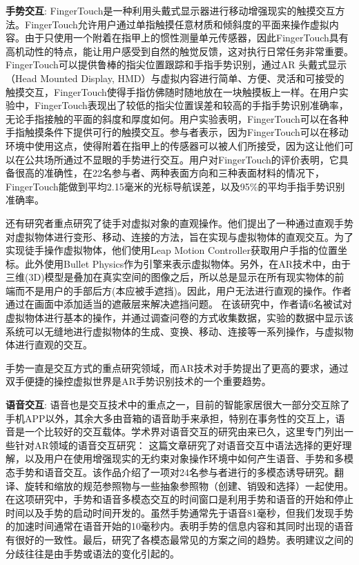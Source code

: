 \textbf{手势交互}: 
FingerTouch\cite{OhParPar20}是一种利用头戴式显示器进行移动增强现实的触摸交互方法。FingerTouch允许用户通过单指触摸任意材质和倾斜度的平面来操作虚拟内容。由于只使用一个附着在指甲上的惯性测量单元传感器，因此FingerTouch具有高机动性的特点，能让用户感受到自然的触觉反馈，这对执行日常任务非常重要。
FingerTouch可以提供鲁棒的指尖位置跟踪和手指手势识别，通过AR 头戴式显示（Head Mounted Display, HMD）与虚拟内容进行简单、方便、灵活和可接受的触摸交互，FingerTouch使得手指仿佛随时随地放在一块触摸板上一样。在用户实验中，FingerTouch表现出了较低的指尖位置误差和较高的手指手势识别准确率，无论手指接触的平面的斜度和厚度如何。用户实验表明，FingerTouch可以在各种手指触摸条件下提供可行的触摸交互。参与者表示，因为FingerTouch可以在移动环境中使用这点，使得附着在指甲上的传感器可以被人们所接受，因为这让他们可以在公共场所通过不显眼的手势进行交互。用户对FingerTouch的评价表明，它具备很高的准确性，在22名参与者、两种表面方向和三种表面材料的情况下，FingerTouch能做到平均2.15毫米的光标导航误差，以及95\%的平均手指手势识别准确率。

还有研究者\cite{SakIshHor20}重点研究了徒手对虚拟对象的直观操作。他们提出了一种通过直观手势对虚拟物体进行变形、移动、连接的方法，旨在实现与虚拟物体的直观交互。为了实现徒手操作虚拟物体，他们使用Leap Motion Controller\cite{ultraleap}获取用户手指的位置坐标。此外使用Bullet Physics\cite{BulletPhysics}作为引擎来表示虚拟物体。另外，在AR技术中，由于三维(3D)模型是叠加在真实空间的图像之后，所以总是显示在所有现实物体的前端而不是用户的手部后方(本应被手遮挡)。因此，用户无法进行直观的操作。作者通过在画面中添加适当的遮蔽层来解决遮挡问题。
在该研究中，作者请6名被试对虚拟物体进行基本的操作，并通过调查问卷的方式收集数据，实验的数据中显示该系统可以无缝地进行虚拟物体的生成、变换、移动、连接等一系列操作，与虚拟物体进行直观的交互。

手势一直是交互方式的重点研究领域，而AR技术对手势提出了更高的要求，通过双手便捷的操控虚拟世界是AR手势识别技术的一个重要趋势。

\textbf{语音交互}: 
语音也是交互技术中的重点之一，目前的智能家居很大一部分交互除了手机APP以外，其余大多由音箱的语音助手来承担，特别在事务性的交互上，语音是一个比较好的交互载体。学术界对语音交互的研究由来已久，这里专门列出一些针对AR领域的语音交互研究：
这篇文章\cite{WilOrt20}研究了对语音交互中语法选择的更好理解，以及用户在使用增强现实的无约束对象操作环境中如何产生语音、手势和多模态手势和语音交互。该作品介绍了一项对24名参与者进行的多模态诱导研究。翻译、旋转和缩放的规范参照物与一些抽象参照物（创建、销毁和选择）一起使用。在这项研究中，手势和语音多模态交互的时间窗口是利用手势和语音的开始和停止时间以及手势的启动时间开发的。虽然手势通常先于语音81毫秒，但我们发现手势的加速时间通常在语音开始的10毫秒内。表明手势的信息内容和其同时出现的语音有很好的一致性。最后，研究了各模态最常见的方案之间的趋势。表明建议之间的分歧往往是由手势或语法的变化引起的。


